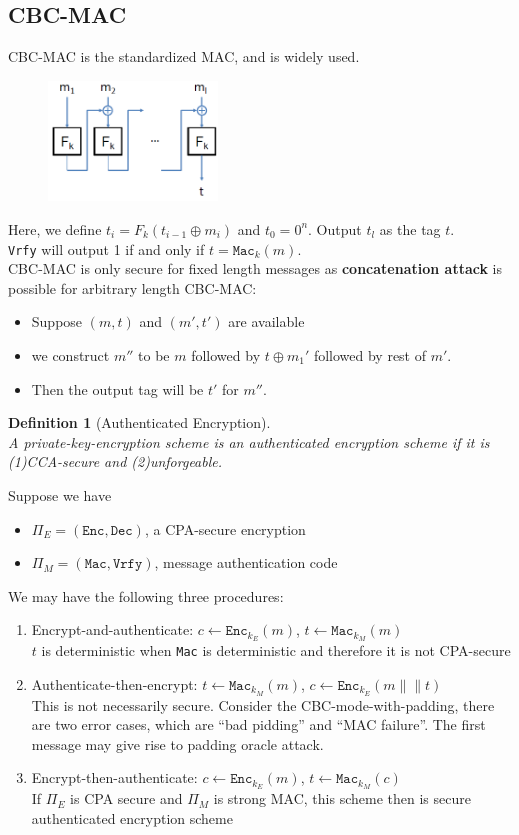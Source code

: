 \documentclass[12pt]{article}
\newtheorem{definition}{Definition}[section]
\theoremstyle{definition}
\begin{document}
\subsection{CBC-MAC}
CBC-MAC is the standardized MAC, and is widely used.
\begin{figure}[h]
\centering
\includegraphics[width=0.4\textwidth]{4.png}
\end{figure}
Here, we define $t_i=F_k(t_{i-1}\oplus m_i)$ and $t_0=0^n$. Output $t_l$ as the tag $t$.\\\texttt{Vrfy} will output 1 if and only if $t=\texttt{Mac}_k(m)$.\\
CBC-MAC is only secure for fixed length messages as \textbf{concatenation attack} is possible for arbitrary length CBC-MAC:
\begin{itemize}
  \item Suppose $(m,t)$ and $(m',t')$ are available
  \item we construct $m''$ to be $m$ followed by $t\oplus m_1'$ followed by rest of $m'$.
  \item Then the output tag will be $t'$ for $m''$.
\end{itemize}
\begin{definition}[Authenticated Encryption]
\hfill\\\normalfont A private-key-encryption scheme is an authenticated encryption scheme if it is (1)CCA-secure and (2)unforgeable.
\end{definition}
Suppose we have 
\begin{itemize}
  \item $\Pi_E=(\texttt{Enc},\texttt{Dec})$, a CPA-secure encryption
  \item $\Pi_M=(\texttt{Mac}, \texttt{Vrfy})$, message authentication code
\end{itemize}
We may have the following three procedures:
\begin{enumerate}
  \item Encrypt-and-authenticate: $c\leftarrow \texttt{Enc}_{k_E}(m)$, $t\leftarrow \texttt{Mac}_{k_M}(m)$\\
  $t$ is deterministic when \texttt{Mac}  is deterministic and therefore it is not CPA-secure
  \item Authenticate-then-encrypt: $t\leftarrow \texttt{Mac}_{k_M}(m)$, $c\leftarrow \texttt{Enc}_{k_E}(m\|\|t)$\\
  This is not necessarily secure. Consider the CBC-mode-with-padding, there are two error cases, which are ``bad pidding'' and ``MAC failure''. The first message may give rise to padding oracle attack.
  \item Encrypt-then-authenticate: $c\leftarrow \texttt{Enc}_{k_E}(m)$, $t\leftarrow \texttt{Mac}_{k_M}(c)$\\
  If $\Pi_E$ is CPA secure and $\Pi_M$ is strong MAC, this scheme then is secure authenticated encryption scheme
\end{enumerate}
\end{document}
